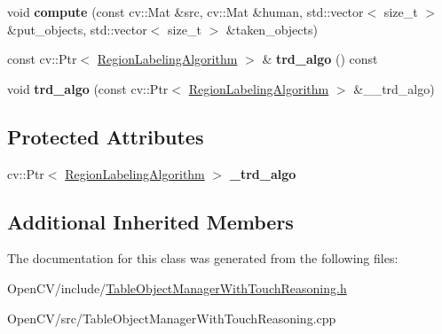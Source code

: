\begin{DoxyCompactItemize}
\hypertarget{classskl_1_1_table_object_manager_with_touch_reasoning_ad7b5c7f0f6839cbf50a3b7cc94ad97f0}{}\label{classskl_1_1_table_object_manager_with_touch_reasoning_ad7b5c7f0f6839cbf50a3b7cc94ad97f0} 
void {\bfseries compute} (const cv\+::\+Mat \&src, cv\+::\+Mat \&human, std\+::vector$<$ size\+\_\+t $>$ \&put\+\_\+objects, std\+::vector$<$ size\+\_\+t $>$ \&taken\+\_\+objects)
\item 
\hypertarget{classskl_1_1_table_object_manager_with_touch_reasoning_a72f3c6f2f40fe9c21c8596acfc9c76ef}{}\label{classskl_1_1_table_object_manager_with_touch_reasoning_a72f3c6f2f40fe9c21c8596acfc9c76ef} 
const cv\+::\+Ptr$<$ \hyperlink{classskl_1_1_filter_mat2_mat}{Region\+Labeling\+Algorithm} $>$ \& {\bfseries trd\+\_\+algo} () const
\item 
\hypertarget{classskl_1_1_table_object_manager_with_touch_reasoning_aa73c7f50cf71adf18e4124bb2ed42806}{}\label{classskl_1_1_table_object_manager_with_touch_reasoning_aa73c7f50cf71adf18e4124bb2ed42806} 
void {\bfseries trd\+\_\+algo} (const cv\+::\+Ptr$<$ \hyperlink{classskl_1_1_filter_mat2_mat}{Region\+Labeling\+Algorithm} $>$ \&\+\_\+\+\_\+trd\+\_\+algo)
\end{DoxyCompactItemize}
\subsection*{Protected Attributes}
\begin{DoxyCompactItemize}
\item 
\hypertarget{classskl_1_1_table_object_manager_with_touch_reasoning_a5496bf298eb0c39c2447dfba5166e7cd}{}\label{classskl_1_1_table_object_manager_with_touch_reasoning_a5496bf298eb0c39c2447dfba5166e7cd} 
cv\+::\+Ptr$<$ \hyperlink{classskl_1_1_filter_mat2_mat}{Region\+Labeling\+Algorithm} $>$ {\bfseries \+\_\+trd\+\_\+algo}
\end{DoxyCompactItemize}
\subsection*{Additional Inherited Members}


The documentation for this class was generated from the following files\+:\begin{DoxyCompactItemize}
\item 
Open\+C\+V/include/\hyperlink{_table_object_manager_with_touch_reasoning_8h}{Table\+Object\+Manager\+With\+Touch\+Reasoning.\+h}\item 
Open\+C\+V/src/Table\+Object\+Manager\+With\+Touch\+Reasoning.\+cpp\end{DoxyCompactItemize}

